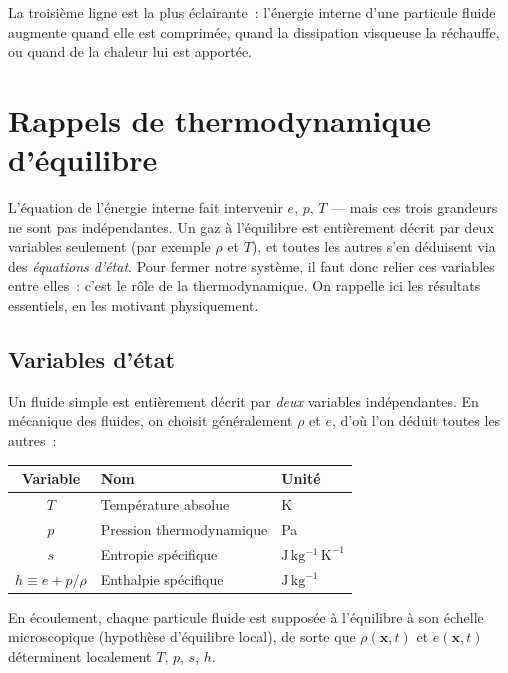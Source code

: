 \documentclass[11pt,a4paper]{report}
\begin{document}
La troisi\`eme ligne est la plus \'eclairante~: l'\'energie interne d'une particule fluide
augmente quand elle est comprim\'ee, quand la dissipation visqueuse la r\'echauffe, ou
quand de la chaleur lui est apport\'ee.

\section{Rappels de thermodynamique d'\'equilibre}

L'\'equation de l'\'energie interne fait intervenir $e$, $p$, $T$ --- mais ces trois grandeurs ne sont pas ind\'ependantes. Un gaz \`a l'\'equilibre est enti\`erement d\'ecrit par deux variables seulement (par exemple $\rho$ et $T$), et toutes les autres s'en d\'eduisent via des \emph{\'equations d'\'etat}. Pour fermer notre syst\`eme, il faut donc relier ces variables entre elles~: c'est le r\^ole de la thermodynamique. On rappelle ici les r\'esultats essentiels, en les motivant physiquement.

\subsection{Variables d'\'etat}

Un fluide simple est enti\`erement d\'ecrit par \emph{deux} variables ind\'ependantes.
En m\'ecanique des fluides, on choisit g\'en\'eralement $\rho$ et $e$, d'o\`u l'on
d\'eduit toutes les autres~:

\begin{center}
\begin{tabular}{cll}
\toprule
Variable & Nom & Unit\'e \\
\midrule
$T$ & Temp\'erature absolue & K \\
$p$ & Pression thermodynamique & Pa \\
$s$ & Entropie sp\'ecifique & $\mathrm{J\,kg^{-1}\,K^{-1}}$ \\
$h \equiv e + p/\rho$ & Enthalpie sp\'ecifique & $\mathrm{J\,kg^{-1}}$ \\
\bottomrule
\end{tabular}
\end{center}

En \'ecoulement, chaque particule fluide est suppos\'ee \`a l'\'equilibre \`a son \'echelle
microscopique (hypoth\`ese d'\'equilibre local), de sorte que $\rho(\bm{x},t)$ et
$e(\bm{x},t)$ d\'eterminent localement $T$, $p$, $s$, $h$.
\end{document}
